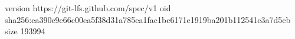 version https://git-lfs.github.com/spec/v1
oid sha256:ea390c9e66c00ea5f38d31a785ea1fac1bc6171e1919ba201b112541c3a7d5cb
size 193994
